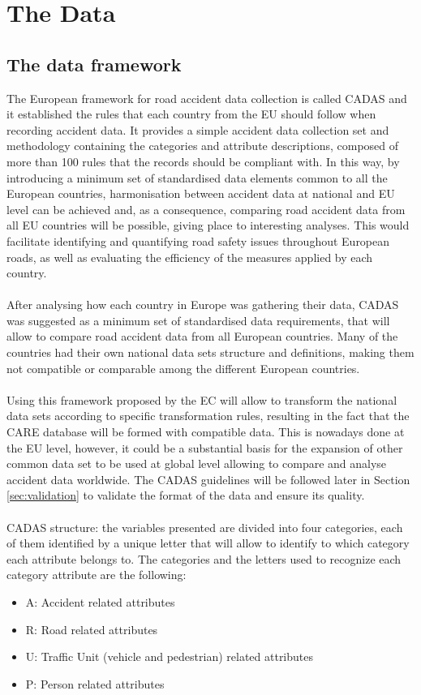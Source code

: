 \chapter{The Data} \label{ch:data}
\section{The data framework} \label{sec:framework}
The European framework for road accident data collection is called \ac{CADAS} \cite{cadas} and it established the rules that each country from the \ac{EU} should follow when recording accident data. It provides a simple accident data collection set and methodology containing the categories and attribute descriptions, composed of more than 100 rules that the records should be compliant with. 
In this way, by introducing a minimum set of standardised data elements common to all the European countries, harmonisation between accident data at national and \ac{EU} level can be achieved and, as a consequence, comparing road accident data from all \ac{EU} countries will be possible, giving place to interesting analyses. This would facilitate identifying and quantifying road safety issues throughout European roads, as well as evaluating the efficiency of the measures applied by each country. 
\\
\\
After analysing how each country in Europe was gathering their data, \ac{CADAS} was suggested as a minimum set of standardised data requirements, that will allow to compare road accident data from all European countries. Many of the countries had their own national data sets structure and definitions, making them not compatible or comparable among the different European countries. 
\\
\\
Using this framework proposed by the \ac{EC} will allow to transform the national data sets according to specific transformation rules, resulting in the fact that the CARE database will be formed with compatible data.
This is nowadays done at the \ac{EU} level, however, it could be a substantial basis for the expansion of other common data set to be used at global level allowing to compare and analyse accident data worldwide. 
The \ac{CADAS} guidelines will be followed later in Section \ref{sec:validation} to validate the format of the data and ensure its quality.
\\
\\
\ac{CADAS} structure:
the variables presented are divided into four categories, each of them identified by a unique letter that will allow to identify to which category each attribute belongs to. The categories and the letters used to recognize each category attribute are the following:
\begin{itemize}
    \item A: Accident related attributes
    \item R: Road related attributes
    \item U: Traffic Unit (vehicle and pedestrian) related attributes
    \item P: Person related attributes
\end{itemize}

